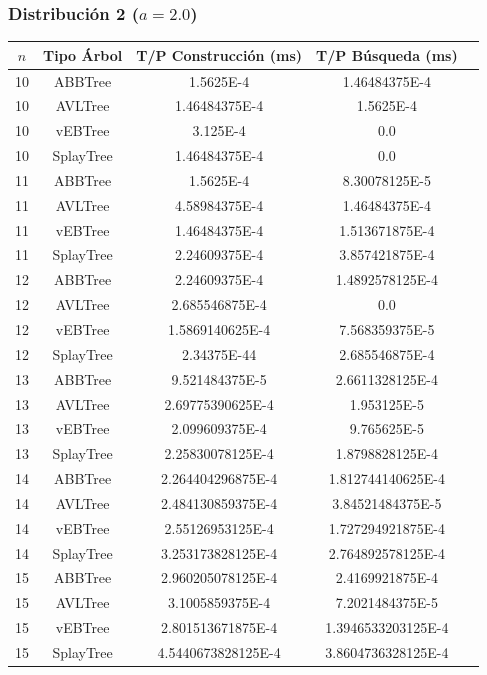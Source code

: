 \documentclass[letterpaper,12pt]{article}
\begin{document}
\subsubsection{Distribución 2 ($a=2.0$)}

\begin{tabular}{|c|c|c|c|c|}
\hline
\textbf{$n$} & \textbf{Tipo Árbol} & \textbf{T/P Construcción (ms)} & \textbf{T/P Búsqueda (ms)} \\
\hline
10 & ABBTree & 1.5625E-4 & 1.46484375E-4 \\
\hline
10 & AVLTree & 1.46484375E-4 & 1.5625E-4 \\
\hline
10 & vEBTree & 3.125E-4 & 0.0\\
\hline
10 & SplayTree & 1.46484375E-4 & 0.0 \\
\hline
\hline
11 & ABBTree & 1.5625E-4 & 8.30078125E-5 \\
\hline
11 & AVLTree & 4.58984375E-4 & 1.46484375E-4 \\
\hline
11 & vEBTree & 1.46484375E-4 & 1.513671875E-4\\
\hline
11 & SplayTree & 2.24609375E-4 & 3.857421875E-4 \\
\hline
\hline
12 & ABBTree & 2.24609375E-4 & 1.4892578125E-4  \\
\hline
12 & AVLTree & 2.685546875E-4 & 0.0 \\
\hline
12 & vEBTree & 1.5869140625E-4 & 7.568359375E-5\\
\hline
12 & SplayTree & 2.34375E-44 & 2.685546875E-4 \\
\hline
\hline
13 & ABBTree & 9.521484375E-5 & 2.6611328125E-4  \\
\hline
13 & AVLTree & 2.69775390625E-4 & 1.953125E-5 \\
\hline
13 & vEBTree & 2.099609375E-4 & 9.765625E-5\\
\hline
13 & SplayTree & 2.25830078125E-4 & 1.8798828125E-4 \\
\hline
\hline
14 & ABBTree & 2.264404296875E-4 & 1.812744140625E-4 \\
\hline
14 & AVLTree & 2.484130859375E-4 & 3.84521484375E-5 \\
\hline
14 & vEBTree & 2.55126953125E-4 & 1.727294921875E-4\\
\hline
14 & SplayTree & 3.253173828125E-4 & 2.764892578125E-4 \\
\hline
\hline
15 & ABBTree & 2.960205078125E-4 & 2.4169921875E-4 \\
\hline
15 & AVLTree & 3.1005859375E-4 & 7.2021484375E-5 \\
\hline
15 & vEBTree & 2.801513671875E-4  & 1.3946533203125E-4\\
\hline
15 & SplayTree & 4.5440673828125E-4 & 3.8604736328125E-4 \\
\hline
\end{tabular}
\end{document}
